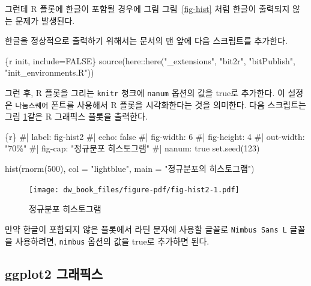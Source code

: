 \documentclass[
  letterpaper,
]{book}
\newenvironment{Shaded}{\begin{snugshade}}{\end{snugshade}}
\newcommand{\InformationTok}[1]{\textcolor[rgb]{0.37,0.37,0.37}{#1}}
\begin{document}
그런데 R 플롯에 한글이 포함될 경우에 그림 그림~\ref{fig-hist} 처럼
한글이 출력되지 않는 문제가 발생된다.

한글을 정상적으로 출력하기 위해서는 문서의 맨 앞에 다음 스크립트를
추가한다.

\begin{Shaded}
\begin{Highlighting}[]
\InformationTok{\textasciigrave{}\textasciigrave{}\textasciigrave{}\{r init, include=FALSE\}}
\InformationTok{source(here::here("\_extensions", "bit2r", "bitPublish", "init\_environments.R"))}
\InformationTok{\textasciigrave{}\textasciigrave{}\textasciigrave{}}
\end{Highlighting}
\end{Shaded}

그런 후, R 플롯을 그리는 \texttt{knitr} 청크에
\texttt{nanum} 옵션의 값을 true로 추가한다. 이 설정은
\texttt{나눔스퀘어} 폰트를 사용해서 R 플롯을 시각화한다는 것을 의미한다.
다음 스크립트는 그림 \ref{fig-hist2}\과 같은 R 그래픽스 플롯을 출력한다.

\begin{Shaded}
\begin{Highlighting}[]
\InformationTok{\textasciigrave{}\textasciigrave{}\textasciigrave{}\{r\}}
\InformationTok{\#| label: fig{-}hist2}
\InformationTok{\#| echo: false}
\InformationTok{\#| fig{-}width: 6}
\InformationTok{\#| fig{-}height: 4}
\InformationTok{\#| out{-}width: "70\%"}
\InformationTok{\#| fig{-}cap: "정규분포 히스토그램"}
\InformationTok{\#| nanum: true}
\InformationTok{set.seed(123)}

\InformationTok{hist(rnorm(500), col = "lightblue", main = "정규분포의 히스토그램")}
\InformationTok{\textasciigrave{}\textasciigrave{}\textasciigrave{}}
\end{Highlighting}
\end{Shaded}

\begin{figure}

{\centering \texttt{[image: dw\_book\_files/figure-pdf/fig-hist2-1.pdf]}

}

\caption{\label{fig-hist2}정규분포 히스토그램}

\end{figure}

만약 한글이 포함되지 않은 플롯에서 라틴 문자에 사용할 글꼴로
\texttt{Nimbus\ Sans\ L} 글꼴을 사용하려면, \texttt{nimbus} 옵션의 값을
true로 추가하면 된다.

\hypertarget{ggplot2-uxadf8uxb798uxd53duxc2a4}{%
\subsection{ggplot2 그래픽스}\label{ggplot2-uxadf8uxb798uxd53duxc2a4}}
\end{document}
